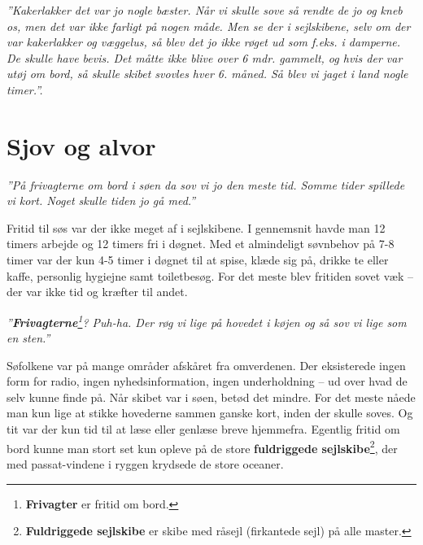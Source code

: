 \emph{''Kakerlakker det var jo nogle bæster. Når vi skulle sove så
rendte de jo og kneb os, men det var ikke farligt på nogen måde. Men se
der i sejlskibene, selv om der var kakerlakker og væggelus, så blev det
jo ikke røget ud som f.eks. i damperne. De skulle have bevis. Det måtte
ikke blive over 6 mdr. gammelt, og hvis der var utøj om bord, så skulle
skibet svovles hver 6. måned. Så blev vi jaget i land nogle timer.''.}

\chapter{Sjov og alvor}

\emph{''På frivagterne om bord i søen da sov vi jo den meste tid. Somme
tider spillede vi kort. Noget skulle tiden jo gå med.''}

Fritid til søs var der ikke meget af i sejlskibene. I gennemsnit havde
man 12 timers arbejde og 12 timers fri i døgnet. Med et almindeligt
søvnbehov på 7-8 timer var der kun 4-5 timer i døgnet til at spise,
klæde sig på, drikke te eller kaffe, personlig hygiejne samt
toiletbesøg. For det meste blev fritiden sovet væk -- der var ikke tid
og kræfter til andet.

\emph{''\textbf{Frivagterne}\footnote{\textbf{Frivagter} er fritid om
  bord.}? Puh-ha. Der røg vi lige på hovedet i køjen og så sov vi lige
som en sten.''}

Søfolkene var på mange områder afskåret fra omverdenen. Der eksisterede
ingen form for radio, ingen nyhedsinformation, ingen underholdning -- ud
over hvad de selv kunne finde på. Når skibet var i søen, betød det
mindre. For det meste nåede man kun lige at stikke hovederne sammen
ganske kort, inden der skulle soves. Og tit var der kun tid til at læse
eller genlæse breve hjemmefra. Egentlig fritid om bord kunne man stort
set kun opleve på de store \textbf{fuldriggede sejlskibe}\footnote{\textbf{Fuldriggede
  sejlskibe} er skibe med råsejl (firkantede sejl) på alle master.}, der
med passat-vindene i ryggen krydsede de store oceaner.

